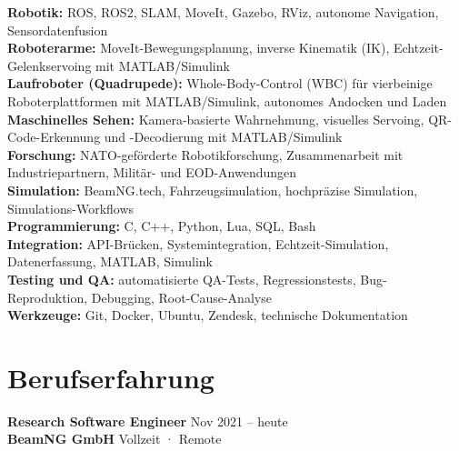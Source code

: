 \documentclass[11pt,a4paper]{article}
\begin{document}
{\small
\textbf{Robotik:} ROS, ROS2, SLAM, MoveIt, Gazebo, RViz, autonome Navigation, Sensordatenfusion\\
\textbf{Roboterarme:} MoveIt-Bewegungsplanung, inverse Kinematik (IK), Echtzeit-Gelenkservoing mit MATLAB/Simulink\\
\textbf{Laufroboter (Quadrupede):} Whole-Body-Control (WBC) für vierbeinige Roboterplattformen mit MATLAB/Simulink, autonomes Andocken und Laden\\
\textbf{Maschinelles Sehen:} Kamera-basierte Wahrnehmung, visuelles Servoing, QR-Code-Erkennung und -Decodierung mit MATLAB/Simulink\\
\textbf{Forschung:} NATO-geförderte Robotikforschung, Zusammenarbeit mit Industriepartnern, Militär- und EOD-Anwendungen\\
\textbf{Simulation:} BeamNG.tech, Fahrzeugsimulation, hochpräzise Simulation, Simulations-Workflows\\
\textbf{Programmierung:} C, C++, Python, Lua, SQL, Bash\\
\textbf{Integration:} API-Brücken, Systemintegration, Echtzeit-Simulation, Datenerfassung, MATLAB, Simulink\\
\textbf{Testing und QA:} automatisierte QA-Tests, Regressionstests, Bug-Reproduktion, Debugging, Root-Cause-Analyse\\
\textbf{Werkzeuge:} Git, Docker, Ubuntu, Zendesk, technische Dokumentation
}

\section*{Berufserfahrung}

\textbf{Research Software Engineer} \hfill Nov 2021 -- heute\\
\textbf{BeamNG GmbH} \hfill Vollzeit · Remote
\end{document}
